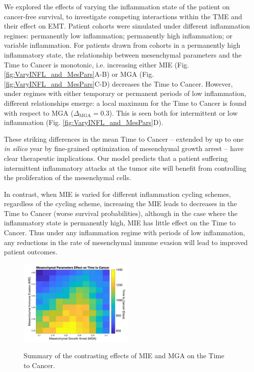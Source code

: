 \documentclass[11pt]{article}
\begin{document}
We explored the effects of varying the inflammation state of the patient on cancer-free survival, to investigate competing interactions within the TME and their effect on EMT. Patient cohorts were simulated under different inflammation regimes: permanently low inflammation; permanently high inflammation; or variable inflammation. For patients drawn from cohorts in a permanently high inflammatory state, the relationship between mesenchymal parameters and the Time to Cancer is monotonic, i.e. increasing either MIE (Fig. \ref{fig:VaryINFL_and_MesPars}A-B) or MGA (Fig. \ref{fig:VaryINFL_and_MesPars}C-D) decreases the Time to Cancer.
However, under regimes with either temporary or permanent periods of low inflammation, different relationships emerge: a local maximum for the Time to Cancer is found with respect to MGA ($\Delta_\text{MGA}= 0.3$). This is seen both for intermittent or low inflammation (Fig. \ref{fig:VaryINFL_and_MesPars}D). 
\par
These striking differences in the mean Time to Cancer -- extended by up to one {\it in silico} year by fine-grained optimization of mesenchymal growth arrest -- have clear therapeutic implications. 
Our model predicts that a patient suffering intermittent inflammatory attacks at the tumor site will benefit from controlling the proliferation of the mesenchymal cells.
\par
In contrast, when MIE is varied for different inflammation cycling schemes, regardless of the cycling scheme, increasing the MIE leads to decreases in the Time to Cancer (worse survival probabilities), although in the case where the inflammatory state is permanently high, MIE has little effect on the Time to Cancer. Thus under any inflammation regime with periods of low inflammation, any reductions in the rate of mesenchymal immune evasion will lead to improved patient outcomes.

\begin{figure}
\center
{\includegraphics[width=0.5\textwidth]{Figure5/MIEvsMGA_bigcbar.jpg}}
\caption{Summary of the contrasting effects of MIE and MGA on the Time to Cancer.
}
\label{fig:MIEvsMGA}
\end{figure}
\end{document}
